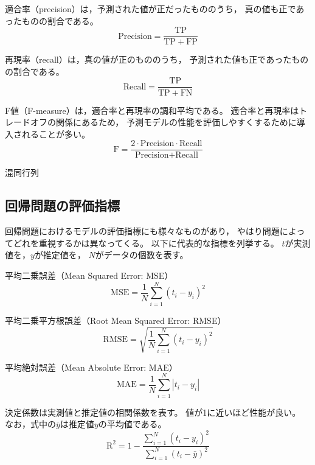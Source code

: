 \documentclass[class=jsarticle, crop=false, dvipdfmx, fleqn]{standalone}
\begin{document}
適合率（precision）は，予測された値が正だったもののうち，
真の値も正であったものの割合である。
\begin{equation}
\text{Precision} = \frac{\mathrm{TP}}{\mathrm{TP + FP}}
\end{equation}

再現率（recall）は，真の値が正のもののうち，
予測された値も正であったものの割合である。
\begin{equation}
\text{Recall} = \frac{\mathrm{TP}}{\mathrm{TP + FN}}
\end{equation}

F値（F-measure）は，適合率と再現率の調和平均である。
適合率と再現率はトレードオフの関係にあるため，
予測モデルの性能を評価しやすくするために導入されることが多い。
\begin{equation}
\text{F} = \frac{\mathrm{2 \cdot \text{Precision} \cdot \text{Recall}}}{\mathrm{\text{Precision} + \text{Recall}}}
\end{equation}


\begin{table}
	\centering
	\caption{混同行列}
	
	\label{tab:confusion_matrix}
\end{table}


\subsection{回帰問題の評価指標}

回帰問題におけるモデルの評価指標にも様々なものがあり，
やはり問題によってどれを重視するかは異なってくる。
以下に代表的な指標を列挙する。
$t$が実測値を，$y$が推定値を，
$N$がデータの個数を表す。

平均二乗誤差（Mean Squared Error: MSE）
\begin{equation}
\mathrm{MSE} = \frac{1}{N} \sum_{i=1}^N (t_i - y_i)^2
\end{equation}

平均二乗平方根誤差（Root Mean Squared Error: RMSE）
\begin{equation}
\mathrm{RMSE} = \sqrt{\frac{1}{N} \sum_{i=1}^N (t_i - y_i)^2}
\end{equation}

平均絶対誤差（Mean Absolute Error: MAE）
\begin{equation}
\mathrm{MAE} = \frac{1}{N} \sum_{i=1}^N |t_i - y_i|
\end{equation}

決定係数は実測値と推定値の相関係数を表す。
値が1に近いほど性能が良い。
なお，式中の$\bar{y}$は推定値$y$の平均値である。
\begin{equation}
\mathrm{R}^2 = 1 - \frac{\sum_{i=1}^N (t_i - y_i)^2}{\sum_{i=1}^N (t_i - \bar{y})^2}
\end{equation}
\end{document}
